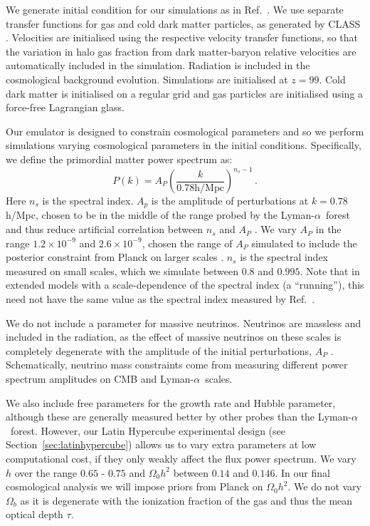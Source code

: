 \documentclass[a4paper,11pt]{article}
\newcommand{\Lya}{Lyman-$\alpha$}
\begin{document}
We generate initial condition for our simulations as in Ref.~\cite{Bird:2020}. We use separate transfer functions for gas and cold dark matter particles, as generated by CLASS \cite{CLASS}. Velocities are initialised using the respective velocity transfer functions, so that the variation in halo gas fraction from dark matter-baryon relative velocities are automatically included in the simulation. Radiation is included in the cosmological background evolution. Simulations are initialised at $z=99$. Cold dark matter is initialised on a regular grid and gas particles are initialised using a force-free Lagrangian glass.

Our emulator is designed to constrain cosmological parameters and so we perform simulations varying cosmological parameters in the initial conditions. Specifically, we define the primordial matter power spectrum as:
\begin{equation}
 P(k) = A_P \left(\frac{k}{ 0.78 \mathrm{h/Mpc}}\right)^{n_s-1}\,.
 \label{eq:pk}
\end{equation}
Here $n_s$ is the spectral index. $A_p$ is the amplitude of perturbations at $k = 0.78$ h/Mpc, chosen to be in the middle of the range probed by the \Lya~forest and thus reduce artificial correlation between $n_s$ and $A_P$ \cite{Bird:2019}. We vary $A_P$ in the range $1.2 \times 10^{-9}$ and $2.6 \times 10^{-9}$, chosen the range of $A_P$ simulated to include the posterior constraint from Planck on larger scales \cite{Planck:2018}.
$n_s$ is the spectral index measured on small scales, which we simulate between $0.8$ and $0.995$. Note that in extended models with a scale-dependence of the spectral index (a ``running''), this need not have the same value as the spectral index measured by Ref.~\cite{Planck:2018}.

We do not include a parameter for massive neutrinos. Neutrinos are massless and included in the radiation, as the effect of massive neutrinos on these scales is completely degenerate with the amplitude of the initial perturbations, $A_P$ \cite{Pedersen:2020}.
Schematically, neutrino mass constraints come from measuring different power spectrum amplitudes on CMB and \Lya~scales.

We also include free parameters for the growth rate and Hubble parameter, although these are generally measured better by other probes than the \Lya~forest. However, our Latin Hypercube experimental design (see Section~\ref{sec:latinhypercube}) allows us to vary extra parameters at low computational cost, if they only weakly affect the flux power spectrum.
We vary $h$ over the range $0.65$ - $0.75$ and $\Omega_0 h^2$ between $0.14$ and $0.146$. In our final cosmological analysis we will impose priors from Planck on $\Omega_0 h^2$.
We do not vary $\Omega_b$ as it is degenerate with the ionization fraction of the gas and thus the mean optical depth $\tau$.
\end{document}
